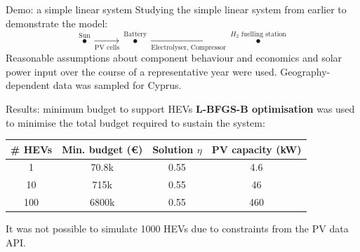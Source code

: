 \documentclass{beamer}
\begin{document}
\begin{frame}{Demo: a simple linear system}
    Studying the simple linear system from earlier to demonstrate the model:
    $$\overset{\text{Sun}}{\bullet} \xrightarrow[\text{PV cells}]{} \overset{\text{Battery}}{\bullet} \xrightarrow[\text{Electrolyser,\ Compressor}]{} \overset{H_{2} \text{ fuelling station}}{\bullet}$$
    \bigbreak
    Reasonable assumptions about component behaviour and economics and solar power input over the course of a representative year were used.
    \bigbreak
    Geography-dependent data was sampled for Cyprus.
\end{frame}

\begin{frame}{Results: minimum budget to support HEVs}
    \textbf{L-BFGS-B optimisation} was used to minimise the total budget required to sustain the system:
    \begin{center}
        \begin{tabular}{|c|c|c|c|}
            \hline
            \# HEVs & Min. budget (\euro{}) & Solution $\eta$ & PV capacity (kW) \\
            \hline
            1       & 70.8k                 & 0.55            & 4.6              \\
            10      & 715k                  & 0.55            & 46               \\
            100     & 6800k                 & 0.55            & 460              \\
            \hline
        \end{tabular}
    \end{center}
    It was not possible to simulate 1000 HEVs due to constraints from the PV data API.
\end{frame}
\end{document}
